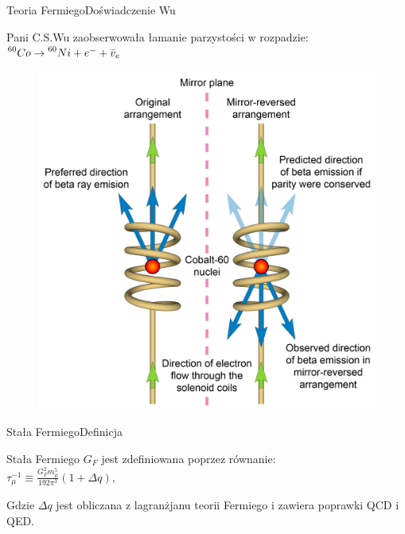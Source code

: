 \documentclass[xcolor={dvipsnames}]{beamer}
\begin{document}
\begin{frame}{Teoria Fermiego}{Doświadczenie Wu}

Pani C.S.Wu zaobserwowała łamanie parzystości w rozpadzie:\\
\centering
\begin{math}
\prescript{60}{}Co \rightarrow \prescript{60}{}Ni + e^- + \bar{v}_e
\end{math} \cite{wuexp}

\begin{figure}
    \includegraphics[scale=0.06]{Wu_experiment.jpg}
\end{figure}

\end{frame}

\begin{frame}{Stała Fermiego}{Definicja}

        Stała Fermiego $G_F$ jest zdefiniowana poprzez równanie:\\


\centering
\begin{math}
        \tau_\mu^{-1} \equiv \frac{G_F^2 m_\mu^5}{192 \pi^3}(1 + \Delta q),
\end{math}\\


\raggedright
    Gdzie $\Delta q$ jest obliczana z lagranżjanu teorii Fermiego i zawiera poprawki QCD i QED. \cite{strauts}
\end{frame}
\end{document}
